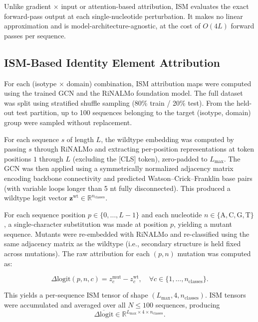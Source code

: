 \documentclass{article}
\begin{document}
Unlike gradient $\times$ input or attention-based attribution, ISM evaluates the exact forward-pass output at each single-nucleotide perturbation. It makes no linear approximation and is model-architecture-agnostic, at the cost of $O(4L)$ forward passes per sequence.

\subsection{ISM-Based Identity Element Attribution}

For each (isotype $\times$ domain) combination, ISM attribution maps were computed using the trained GCN and the RiNALMo foundation model. The full dataset was split using stratified shuffle sampling (80\% train / 20\% test). From the held-out test partition, up to 100 sequences belonging to the target (isotype, domain) group were sampled without replacement.

For each sequence $s$ of length $L$, the wildtype embedding was computed by passing $s$ through RiNALMo and extracting per-position representations at token positions $1$ through $L$ (excluding the [CLS] token), zero-padded to $L_{\max}$. The GCN was then applied using a symmetrically normalized adjacency matrix encoding backbone connectivity and predicted Watson--Crick--Franklin base pairs (with variable loops longer than 5 nt fully disconnected). This produced a wildtype logit vector $\mathbf{z}^{\mathrm{wt}} \in \mathbb{R}^{n_{\mathrm{classes}}}$.

For each sequence position $p \in \{0, \ldots, L-1\}$ and each nucleotide $n \in \{\mathrm{A}, \mathrm{C}, \mathrm{G}, \mathrm{T}\}$, a single-character substitution was made at position $p$, yielding a mutant sequence. Mutants were re-embedded with RiNALMo and re-classified using the same adjacency matrix as the wildtype (i.e., secondary structure is held fixed across mutations). The raw attribution for each $(p,n)$ mutation was computed as:

\begin{equation}
\Delta \mathrm{logit}(p,n,c)
= z^{\mathrm{mut}}_{c} - z^{\mathrm{wt}}_{c},
\quad \forall c \in \{1, \ldots, n_{\mathrm{classes}}\}.
\end{equation}

This yields a per-sequence ISM tensor of shape $(L_{\max}, 4, n_{\mathrm{classes}})$. ISM tensors were accumulated and averaged over all $N \leq 100$ sequences, producing
\[
\overline{\Delta \mathrm{logit}} \in \mathbb{R}^{L_{\max} \times 4 \times n_{\mathrm{classes}}}.
\]
\end{document}
